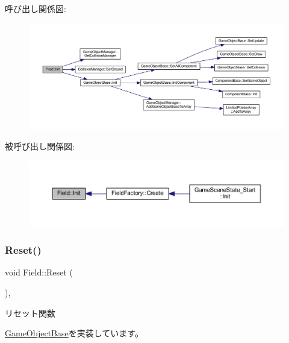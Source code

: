 呼び出し関係図\+:\nopagebreak
\begin{figure}[H]
\begin{center}
\leavevmode
\includegraphics[width=350pt]{class_field_a8360ab68eaf346984eab8bce4c37c3b3_cgraph}
\end{center}
\end{figure}
被呼び出し関係図\+:\nopagebreak
\begin{figure}[H]
\begin{center}
\leavevmode
\includegraphics[width=350pt]{class_field_a8360ab68eaf346984eab8bce4c37c3b3_icgraph}
\end{center}
\end{figure}
\mbox{\label{class_field_a5b140074dcca821ac702da348238c6d4}} 
\subsubsection{\texorpdfstring{Reset()}{Reset()}}
{\footnotesize\ttfamily void Field\+::\+Reset (\begin{DoxyParamCaption}{ }\end{DoxyParamCaption})\hspace{0.3cm}{\ttfamily [override]}, {\ttfamily [virtual]}}



リセット関数 



\mbox{\hyperlink{class_game_object_base_a85c59554f734bcb09f1a1e18d9517dce}{Game\+Object\+Base}}を実装しています。



